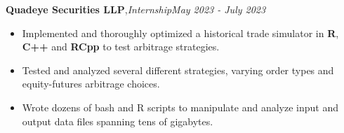 \textbf{Quadeye Securities LLP}\sep{\it Internship}\hfill {\sl \small May 2023 - July 2023}\\
\vspace{-5pt}
\begin{itemize}[itemsep = -1.3 mm, leftmargin=*]
\item Implemented and thoroughly optimized a historical trade simulator in \textbf{R}, \textbf{C++} and \textbf{RCpp} to test arbitrage strategies.
\item Tested and analyzed several different strategies, varying order types and equity-futures arbitrage choices.
\item Wrote dozens of bash and R scripts to manipulate and analyze input and output data files spanning tens of gigabytes.
\end{itemize}